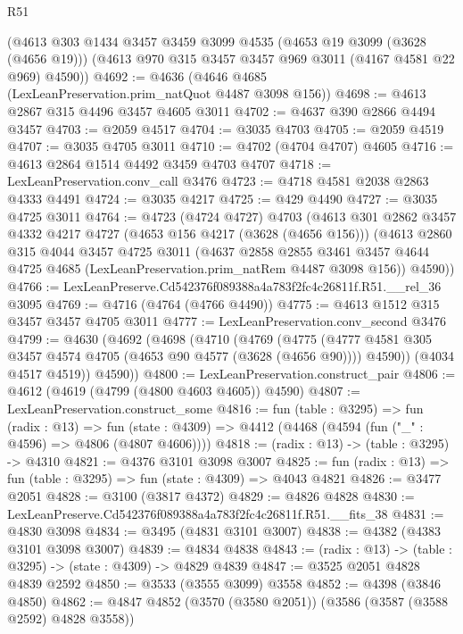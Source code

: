 \begin{lexlean}{R51}
\begin{coremodule}
    (@4613
      @303
      @1434
      @3457
      @3459
      @3099
      @4535
      (@4653 @19 @3099 (@3628 (@4656 @19)))
      (@4613 @970 @315 @3457 @3457 @969 @3011 (@4167 @4581 @22 @969) @4590))
@4692 := @4636 (@4646 @4685 (LexLeanPreservation.prim_natQuot @4487 @3098 @156))
@4698 := @4613 @2867 @315 @4496 @3457 @4605 @3011
@4702 := @4637 @390 @2866 @4494 @3457
@4703 := @2059 @4517
@4704 := @3035 @4703
@4705 := @2059 @4519
@4707 := @3035 @4705 @3011
@4710 := @4702 (@4704 @4707) @4605
@4716 := @4613 @2864 @1514 @4492 @3459 @4703 @4707
@4718 := LexLeanPreservation.conv_call @3476
@4723 := @4718 @4581 @2038 @2863 @4333 @4491
@4724 := @3035 @4217
@4725 := @429 @4490
@4727 := @3035 @4725 @3011
@4764 := @4723
    (@4724 @4727)
    @4703
    (@4613
      @301
      @2862
      @3457
      @4332
      @4217
      @4727
      (@4653 @156 @4217 (@3628 (@4656 @156)))
      (@4613
        @2860
        @315
        @4044
        @3457
        @4725
        @3011
        (@4637
          @2858
          @2855
          @3461
          @3457
          @4644
          @4725
          @4685
          (LexLeanPreservation.prim_natRem @4487 @3098 @156))
        @4590))
@4766 := LexLeanPreserve.Cd542376f089388a4a783f2fc4c26811f.R51.__rel_36 @3095
@4769 := @4716 (@4764 (@4766 @4490))
@4775 := @4613 @1512 @315 @3457 @3457 @4705 @3011
@4777 := LexLeanPreservation.conv_second @3476
@4799 := @4630
    (@4692
      (@4698
        (@4710
          (@4769
            (@4775
              (@4777 @4581 @305 @3457 @4574 @4705 (@4653 @90 @4577 (@3628 (@4656 @90))))
              @4590))
          (@4034 @4517 @4519))
        @4590))
@4800 := LexLeanPreservation.construct_pair
@4806 := @4612 (@4619 (@4799 (@4800 @4603 @4605)) @4590)
@4807 := LexLeanPreservation.construct_some
@4816 := fun (table : @3295) =>
  fun (radix : @13) =>
  fun (state : @4309) => @4412 (@4468 (@4594 (fun ("_" : @4596) => @4806 (@4807 @4606))))
@4818 := (radix : @13) -> (table : @3295) -> @4310
@4821 := @4376 @3101 @3098 @3007
@4825 := fun (radix : @13) => fun (table : @3295) => fun (state : @4309) => @4043 @4821
@4826 := @3477 @2051
@4828 := @3100 (@3817 @4372)
@4829 := @4826 @4828
@4830 := LexLeanPreserve.Cd542376f089388a4a783f2fc4c26811f.R51.__fits_38
@4831 := @4830 @3098
@4834 := @3495 (@4831 @3101 @3007)
@4838 := @4382 (@4383 @3101 @3098 @3007)
@4839 := @4834 @4838
@4843 := (radix : @13) -> (table : @3295) -> (state : @4309) -> @4829 @4839
@4847 := @3525 @2051 @4828 @4839 @2592
@4850 := @3533 (@3555 @3099) @3558
@4852 := @4398 (@3846 @4850)
@4862 := @4847 @4852 (@3570 (@3580 @2051)) (@3586 (@3587 (@3588 @2592) @4828 @3558))

\end{coremodule}
\end{lexlean}
